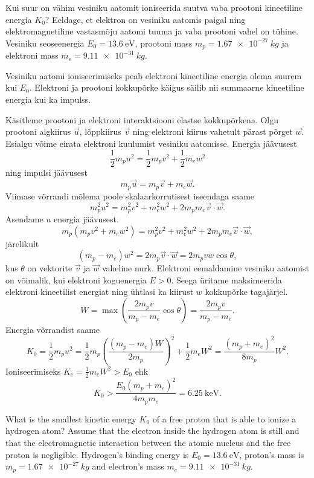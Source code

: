 
Kui suur on vähim vesiniku aatomit ioniseerida suutva vaba prootoni kineetiline energia $K_0$? Eeldage, et elektron on vesiniku aatomis paigal ning elektromagnetiline vastasmõju aatomi tuuma ja vaba prootoni vahel on tühine. Vesiniku seoseenergia $E_0 = \SI{13.6}{\electronvolt}$, prootoni mass $m_p=\SI{1.67e-27}{kg}$ ja elektroni mass $m_e=\SI{9.11e-31}{kg}$.

\hint
Vesiniku aatomi ioniseerimiseks peab elektroni kineetiline energia olema suurem kui $E_0$. Elektroni ja prootoni kokkupõrke käigus säilib nii summaarne kineetiline energia kui ka impulss.

\solu
Käsitleme prootoni ja elektroni interaktsiooni elastse kokkupõrkena. Olgu prootoni algkiirus $\vec{u}$, lõppkiirus $\vec{v}$ ning elektroni kiirus vahetult pärast põrget $\vec{w}$. Esialgu võime eirata elektroni kuulumist vesiniku aatomisse. Energia jäävusest
\[
\frac{1}{2}m_p u^2 = \frac{1}{2}m_p v^2 + \frac{1}{2}m_e w^2
\]
ning impulsi jäävusest
\[
m_p \vec{u} = m_p \vec{v} + m_e \vec{w}.
\]
Viimase võrrandi mõlema poole skalaarkorrutisest iseendaga saame
\[
m_p^2 u^2 = m_p^2 v^2 + m_e^2 w^2 + 2 m_p m_e \vec{v}\cdot \vec{w}.
\]
Asendame $u$ energia jäävusest.
\[
m_p ( m_p v^2 + m_e w^2 ) = m_p^2 v^2 + m_e^2 w^2 + 2 m_p m_e \vec{v}\cdot \vec{w},
\]
järelikult
\[
( m_p - m_e ) w^2 = 2 m_p \vec{v}\cdot\vec{w} = 2 m_p vw \cos\theta,
\]
kus $\theta$ on vektorite $\vec{v}$ ja $\vec{w}$ vaheline nurk. Elektroni eemaldamine vesiniku aatomist on võimalik, kui elektroni koguenergia $E>0$. Seega üritame maksimeerida elektroni kineetilist energiat ning ühtlasi ka kiirust $w$ kokkupõrke tagajärjel.
\[
W = \max\left(\frac{2 m_p v}{m_p - m_e}\cos\theta\right) = \frac{2 m_p v}{m_p - m_e}.
\]
Energia võrrandist saame
\[
K_0 = \frac{1}{2}m_p u^2 = \frac{1}{2}m_p \left(\frac{( m_p - m_e ) W}{2 m_p}\right)^2 + \frac{1}{2}m_e W^2 = \frac{(m_p + m_e)^2}{8 m_p} W^2.
\]
Ioniseerimiseks $K_e = \frac{1}{2}m_e W^2 > E_0$ ehk
\[
K_0 > \frac{E_0 (m_p + m_e)^2}{4 m_p m_e} = \SI{6.25}{\kilo\electronvolt}.
\]

What is the smallest kinetic energy $K_0$ of a free proton that is able to ionize a hydrogen atom? Assume that the electron inside the hydrogen atom is still and that the electromagnetic interaction between the atomic nucleus and the free proton is negligible. Hydrogen’s binding energy is $E_0 = \SI{13.6}{\electronvolt}$, proton’s mass is $m_p=\SI{1.67e-27}{kg}$ and electron’s mass $m_e=\SI{9.11e-31}{kg}$.

